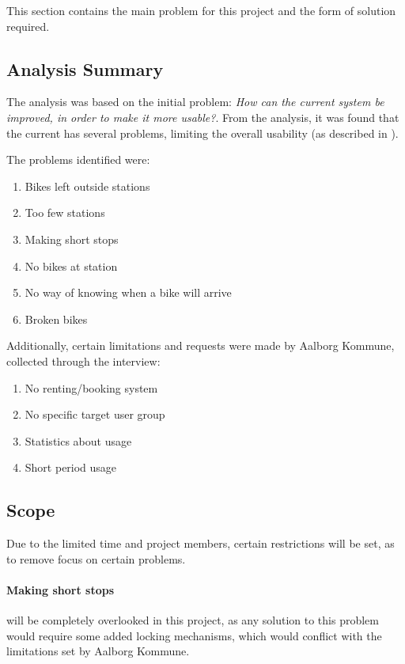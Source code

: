 This section contains the main problem for this project and the form of solution required.

\subsection{Analysis Summary}
The analysis was based on the initial problem: \textit{How can the current \citybike system be improved, in order to make it more usable?}.
From the analysis, it was found that the current \citybike has several problems, limiting the overall usability (as described in ).

The problems identified were:
\begin{enumerate}
\item Bikes left outside stations \label{pr_stations}
\item Too few stations \label{pr_few}
\item Making short stops \label{pr_stops}
\item No bikes at station \label{pr_nobikes}
\item No way of knowing when a bike will arrive \label{pr_arrive}
\item Broken bikes \label{pr_broken}
\end{enumerate}

Additionally, certain limitations and requests were made by Aalborg Kommune, collected through the interview:

\begin{enumerate}
\item No renting/booking system
\item No specific target user group
\item Statistics about usage
\item Short period usage
\end{enumerate}

\subsection{Scope}
Due to the limited time and project members, certain restrictions will be set, as to remove focus on certain problems.

\paragraph{Making short stops} will be completely overlooked in this project, as any solution to this problem would require some added locking mechanisms, which would conflict with the limitations set by Aalborg Kommune.

